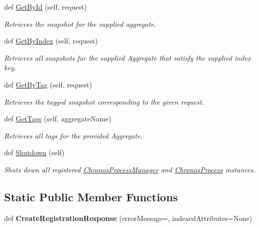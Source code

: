 \begin{DoxyCompactItemize}
def \hyperlink{group__Chronos_ga1dd0cc5ef184d3634b482e16bdfaaffe}{Get\+By\+Id} (self, request)
\begin{DoxyCompactList}\small\item\em Retrieves the snapshot for the supplied aggregate. \end{DoxyCompactList}\item 
def \hyperlink{group__Chronos_ga46ee58f34474277a9b54d3e1814c8115}{Get\+By\+Index} (self, request)
\begin{DoxyCompactList}\small\item\em Retrieves all snapshots for the supplied Aggregate that satisfy the supplied index key. \end{DoxyCompactList}\item 
def \hyperlink{group__Chronos_ga3abe9fb6af06ad9e1cce2a645624dbbe}{Get\+By\+Tag} (self, request)
\begin{DoxyCompactList}\small\item\em Retrieves the tagged snapshot corresponding to the given request. \end{DoxyCompactList}\item 
def \hyperlink{group__Chronos_ga66539ba88e0de9efc24890c09a720b7e}{Get\+Tags} (self, aggregate\+Name)
\begin{DoxyCompactList}\small\item\em Retrieves all tags for the provided Aggregate. \end{DoxyCompactList}\item 
def \hyperlink{group__Chronos_gafce09c1b25233cee3a27f22c1073896e}{Shutdown} (self)
\begin{DoxyCompactList}\small\item\em Shuts down all registered \hyperlink{classChronos_1_1Gateway_1_1ChronosProcessManager}{Chronos\+Process\+Manager} and \hyperlink{classChronos_1_1Gateway_1_1ChronosProcess}{Chronos\+Process} instances. \end{DoxyCompactList}\end{DoxyCompactItemize}
\subsection*{Static Public Member Functions}
\begin{DoxyCompactItemize}
\item 
def {\bfseries Create\+Registration\+Response} (error\+Message=\textquotesingle{}\textquotesingle{}, indexed\+Attributes=None)
\end{DoxyCompactItemize}
